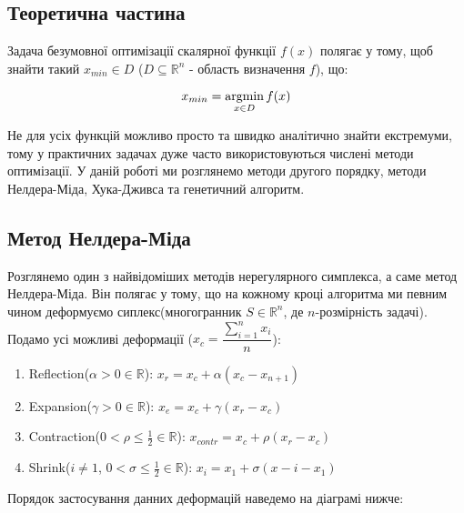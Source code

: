 \begin{center}
    \section*{Теоретична частина}
\end{center}

Задача безумовної оптимізації скалярної функції $f(x)$
полягає у тому, щоб знайти такий $x_{min} \in D$
($ D \subseteq \mathbb{R}^n $ - область визначення $f$), що:

\begin{equation} \label{eq:optimization_task}
    x_{min} = \mathop{\mathrm{argmin}}\limits_{x \in D} f(x)
\end{equation}

Не для усіх функцій можливо просто та швидко
аналітично знайти екстремуми, тому у практичних
задачах дуже часто використовуються числені методи
оптимізації. У даній роботі ми розглянемо методи другого порядку,
методи Нелдера-Міда, Хука-Дживса та генетичний алгоритм.

\subsection*{Метод Нелдера-Міда}

Розглянемо один з найвідоміших методів нерегулярного симплекса,
а саме метод Нелдера-Міда. Він полягає у тому, що на кожному кроці
алгоритма ми певним чином деформуємо сиплекс(многогранник
$S \in \mathbb{R}^{n}$, де $n$-розмірність задачі).
Подамо усі можливі деформації ($x_c = \dfrac{\sum\limits_{i=1}^{n} x_i}{n}$):
\begin{enumerate}
    \item Reflection($\alpha > 0 \in \mathbb{R}$):
    $ x_r = x_c + \alpha(x_c - x_{n+1}) $
    \item Expansion($\gamma > 0 \in \mathbb{R}$):
    $ x_e = x_c + \gamma (x_r - x_c) $
    \item Contraction($0 < \rho \leq \frac{1}{2} \in \mathbb{R}$):
    $ x_{contr} = x_c + \rho (x_r - x_c) $
    \item Shrink($i \neq 1$, $0 < \sigma  \leq \frac{1}{2} \in \mathbb{R}$): $x_i = x_1 + \sigma(x-i - x_1)$
\end{enumerate}
Порядок застосування данних деформацій наведемо на діаграмі нижче:


